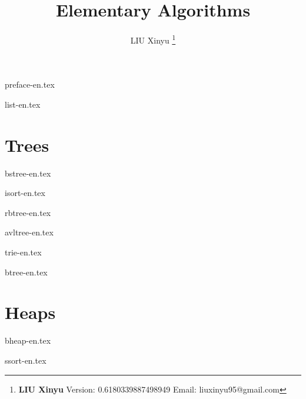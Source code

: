 \documentclass[b5paper,twoside]{book}
\begin{document}


\title{
  {\bf \Huge Elementary Algorithms}
  \centering
}

\author{LIU Xinyu
  \thanks{{\bfseries LIU Xinyu } \newline
    Version: 0.6180339887498949 \newline
    Email: liuxinyu95@gmail.com \newline
}}

\maketitle


\tableofcontents
\newpage

{preface-en.tex}

{list-en.tex}

\part{Trees}
{bstree-en.tex}

{isort-en.tex}

{rbtree-en.tex}

{avltree-en.tex}

{trie-en.tex}

{btree-en.tex}


\part{Heaps}
{bheap-en.tex}

{ssort-en.tex}
\end{document}
